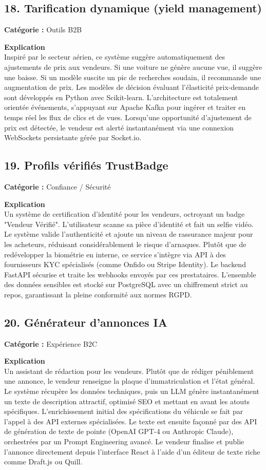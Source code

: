 \documentclass[11pt,a4paper]{article}
\begin{document}
\subsection{18. Tarification dynamique (yield management)}
\textbf{Catégorie :} Outils B2B

\textbf{Explication}\\
Inspiré par le secteur aérien, ce système suggère automatiquement des ajustements de prix aux vendeurs. Si une voiture ne génère aucune vue, il suggère une baisse. Si un modèle suscite un pic de recherches soudain, il recommande une augmentation de prix. Les modèles de décision évaluant l'élasticité prix-demande sont développés en Python avec Scikit-learn. L'architecture est totalement orientée événements, s'appuyant sur Apache Kafka pour ingérer et traiter en temps réel les flux de clics et de vues. Lorsqu'une opportunité d'ajustement de prix est détectée, le vendeur est alerté instantanément via une connexion WebSockets persistante gérée par Socket.io.

\subsection{19. Profils vérifiés TrustBadge}
\textbf{Catégorie :} Confiance / Sécurité

\textbf{Explication}\\
Un système de certification d'identité pour les vendeurs, octroyant un badge "Vendeur Vérifié". L'utilisateur scanne sa pièce d'identité et fait un selfie vidéo. Le système valide l'authenticité et ajoute un niveau de rassurance majeur pour les acheteurs, réduisant considérablement le risque d'arnaques. Plutôt que de redévelopper la biométrie en interne, ce service s'intègre via API à des fournisseurs KYC spécialisés (comme Onfido ou Stripe Identity). Le backend FastAPI sécurise et traite les webhooks envoyés par ces prestataires. L'ensemble des données sensibles est stocké sur PostgreSQL avec un chiffrement strict au repos, garantissant la pleine conformité aux normes RGPD.

\subsection{20. Générateur d'annonces IA}
\textbf{Catégorie :} Expérience B2C

\textbf{Explication}\\
Un assistant de rédaction pour les vendeurs. Plutôt que de rédiger péniblement une annonce, le vendeur renseigne la plaque d'immatriculation et l'état général. Le système récupère les données techniques, puis un LLM génère instantanément un texte de description attractif, optimisé SEO et mettant en avant les atouts spécifiques. L'enrichissement initial des spécifications du véhicule se fait par l'appel à des API externes spécialisées. Le texte est ensuite façonné par des API de génération de texte de pointe (OpenAI GPT-4 ou Anthropic Claude), orchestrées par un Prompt Engineering avancé. Le vendeur finalise et publie l'annonce directement depuis l'interface React à l'aide d'un éditeur de texte riche comme Draft.js ou Quill.
\end{document}
